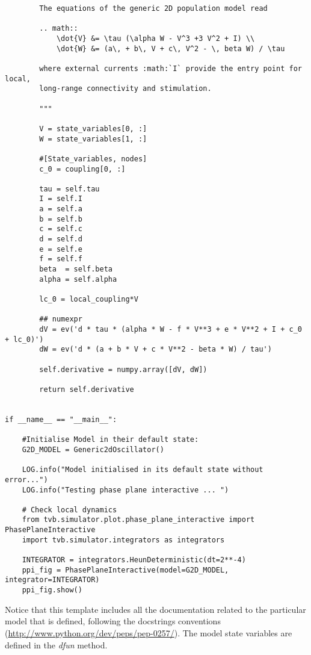 \documentclass{article}
\begin{document}
\begin{lstlisting}
        The equations of the generic 2D population model read

        .. math::
            \dot{V} &= \tau (\alpha W - V^3 +3 V^2 + I) \\
            \dot{W} &= (a\, + b\, V + c\, V^2 - \, beta W) / \tau

        where external currents :math:`I` provide the entry point for local, 
        long-range connectivity and stimulation.

        """

        V = state_variables[0, :]
        W = state_variables[1, :]

        #[State_variables, nodes]
        c_0 = coupling[0, :]
        
        tau = self.tau
        I = self.I
        a = self.a
        b = self.b
        c = self.c
        d = self.d
        e = self.e
        f = self.f
        beta  = self.beta
        alpha = self.alpha

        lc_0 = local_coupling*V
        
        ## numexpr       
        dV = ev('d * tau * (alpha * W - f * V**3 + e * V**2 + I + c_0 + lc_0)')
        dW = ev('d * (a + b * V + c * V**2 - beta * W) / tau')

        self.derivative = numpy.array([dV, dW])
        
        return self.derivative


if __name__ == "__main__":
    
    #Initialise Model in their default state:
    G2D_MODEL = Generic2dOscillator()
    
    LOG.info("Model initialised in its default state without error...")
    LOG.info("Testing phase plane interactive ... ")
    
    # Check local dynamics
    from tvb.simulator.plot.phase_plane_interactive import PhasePlaneInteractive
    import tvb.simulator.integrators as integrators
        
    INTEGRATOR = integrators.HeunDeterministic(dt=2**-4)
    ppi_fig = PhasePlaneInteractive(model=G2D_MODEL, integrator=INTEGRATOR)
    ppi_fig.show()

\end{lstlisting} 

Notice that this template includes all the documentation related to the particular model that is defined, following the docstrings conventions
(\url{http://www.python.org/dev/peps/pep-0257/}). The model state variables are defined in the \emph{dfun} method.
\end{document}
